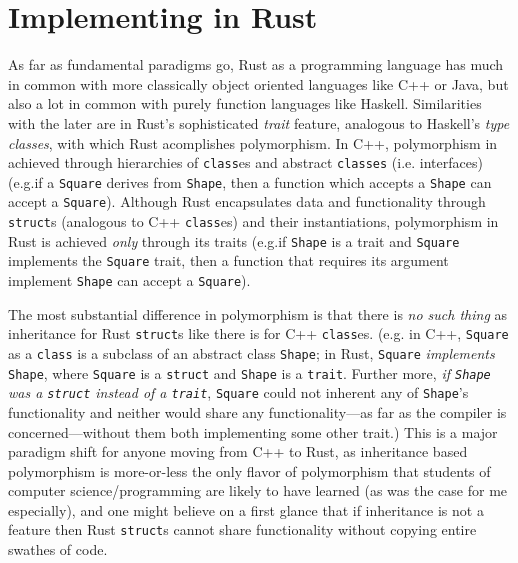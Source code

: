\documentclass{report}
\begin{document}
\section{Implementing in Rust}

As far as fundamental paradigms go, Rust as a programming language has much in
common with more classically object oriented languages like C++ or Java, but
also a lot in common with purely function languages like Haskell.
Similarities with the later are in Rust's sophisticated \emph{trait} feature,
analogous to Haskell's \emph{type classes}, with which Rust acomplishes
polymorphism.
In C++, polymorphism in achieved through hierarchies of \texttt{class}es and
abstract \texttt{classes} (i.e. interfaces)
(e.g.\@ if a \texttt{Square} derives from \texttt{Shape}, then a function which
accepts a \texttt{Shape} can accept a \texttt{Square}).
Although Rust encapsulates data and functionality through \texttt{struct}s
(analogous to C++ \texttt{class}es) and their instantiations,
polymorphism in Rust is achieved \emph{only} through its traits
(e.g.\@ if \texttt{Shape} is a trait and \texttt{Square} implements the \texttt{Square}
trait, then a function that requires its argument implement \texttt{Shape} can
accept a \texttt{Square}).

The most substantial difference in polymorphism is that there is \emph{no such
thing} as inheritance for Rust \texttt{struct}s like there is for C++
\texttt{class}es. (e.g. in C++, \texttt{Square} as a \texttt{class} is a subclass of
an abstract class \texttt{Shape};
in Rust, \texttt{Square} \emph{implements} \texttt{Shape}, where \texttt{Square} is a
\texttt{struct} and \texttt{Shape} is a \texttt{trait}. Further more, \emph{if
\texttt{Shape} was a \texttt{struct} instead of a \texttt{trait}},
\texttt{Square} could not inherent any of \texttt{Shape}'s functionality and neither
would share any functionality---as far as the compiler is concerned---without
them both implementing some other trait.)
This is a major paradigm shift for anyone moving from C++ to Rust, as
inheritance based polymorphism is more-or-less the only flavor of polymorphism
that students of computer science/programming are likely to have learned (as was
the case for me especially), and one might believe on a first glance that if
inheritance is not a feature then Rust \texttt{struct}s cannot share functionality
without copying entire swathes of code.
\end{document}
